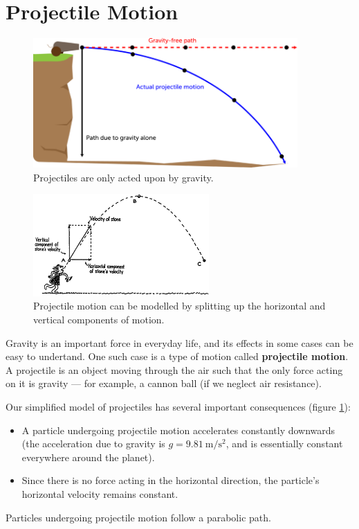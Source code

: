 \documentclass[a4paper]{amsbook}
\newcommand\capcite[1]{}
\begin{document}
\section{Projectile Motion}
\begin{figure}
  \centering
  \includegraphics[width=0.9\textwidth]{projectile}
  \caption{Projectiles are only acted upon by gravity. \capcite{http://cimg2.ck12.org/datastreams/f-d\%3Abb024be6673110b31e78b46819e792adaed8dc661e082a61f0a6d64e\%2BIMAGE\%2BIMAGE.1}\label{fig:projectile}}
\end{figure}
\begin{figure}
  \centering
  \includegraphics[width=0.6\textwidth]{components}
  \caption{Projectile motion can be modelled by splitting up the horizontal and vertical components of motion. \capcite{http://dev.physicslab.org/img/06743d2f-de75-41fd-8b87-7130f9112bbb.gif}\label{fig:components}}
\end{figure}
Gravity is an important force in everyday life, and its effects in some cases can be easy to undertand. One such case
is a type of motion called \textbf{projectile motion}. A projectile is an object moving through the air such that the
only force acting on it is gravity --- for example, a cannon ball (if we neglect air resistance).

Our simplified model of projectiles has several important consequences (figure \ref{fig:projectile}):
\begin{itemize}
  \item A particle undergoing projectile motion accelerates constantly downwards (the acceleration due to gravity
        is $ g = \SI{9.81}{\metre\per\second\squared} $, and is essentially constant everywhere around the planet).
  \item Since there is no force acting in the horizontal direction, the particle's horizontal velocity remains constant.
\end{itemize}
Particles undergoing projectile motion follow a parabolic path.
\end{document}
